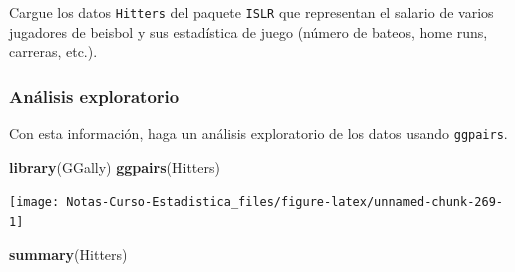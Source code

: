 \documentclass[
  12pt,
]{book}
\newenvironment{Shaded}{\begin{snugshade}}{\end{snugshade}}
\newcommand{\KeywordTok}[1]{\textcolor[rgb]{0.13,0.29,0.53}{\textbf{#1}}}
\newcommand{\NormalTok}[1]{#1}
\theoremstyle{definition}
\theoremstyle{definition}
\theoremstyle{definition}
\theoremstyle{remark}
\begin{document}
Cargue los datos \texttt{Hitters} del paquete \texttt{ISLR} que representan el salario de varios jugadores de beisbol y sus estadística de juego (número de bateos, home runs, carreras, etc.).

\hypertarget{anuxe1lisis-exploratorio}{%
\subsubsection{Análisis exploratorio}\label{anuxe1lisis-exploratorio}}

Con esta información, haga un análisis exploratorio de los datos usando \texttt{ggpairs}.

\begin{Shaded}
\begin{Highlighting}[]
\KeywordTok{library}\NormalTok{(GGally)}
\KeywordTok{ggpairs}\NormalTok{(Hitters)}
\end{Highlighting}
\end{Shaded}

\begin{center}\texttt{[image: Notas-Curso-Estadistica\_files/figure-latex/unnamed-chunk-269-1]} \end{center}

\begin{Shaded}
\begin{Highlighting}[]
\KeywordTok{summary}\NormalTok{(Hitters)}
\end{Highlighting}
\end{Shaded}
\end{document}
